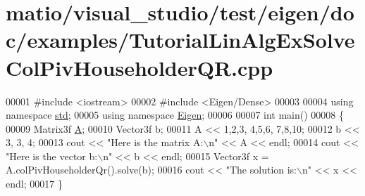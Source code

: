 \hypertarget{matio_2visual__studio_2test_2eigen_2doc_2examples_2_tutorial_lin_alg_ex_solve_col_piv_householder_q_r_8cpp_source}{}\section{matio/visual\+\_\+studio/test/eigen/doc/examples/\+Tutorial\+Lin\+Alg\+Ex\+Solve\+Col\+Piv\+Householder\+QR.cpp}
\label{matio_2visual__studio_2test_2eigen_2doc_2examples_2_tutorial_lin_alg_ex_solve_col_piv_householder_q_r_8cpp_source}

\begin{DoxyCode}
00001 \textcolor{preprocessor}{#include <iostream>}
00002 \textcolor{preprocessor}{#include <Eigen/Dense>}
00003 
00004 \textcolor{keyword}{using namespace }\hyperlink{namespacestd}{std};
00005 \textcolor{keyword}{using namespace }\hyperlink{namespace_eigen}{Eigen};
00006 
00007 \textcolor{keywordtype}{int} main()
00008 \{
00009    Matrix3f \hyperlink{group___core___module_class_eigen_1_1_matrix}{A};
00010    Vector3f b;
00011    A << 1,2,3,  4,5,6,  7,8,10;
00012    b << 3, 3, 4;
00013    cout << \textcolor{stringliteral}{"Here is the matrix A:\(\backslash\)n"} << A << endl;
00014    cout << \textcolor{stringliteral}{"Here is the vector b:\(\backslash\)n"} << b << endl;
00015    Vector3f x = A.colPivHouseholderQr().solve(b);
00016    cout << \textcolor{stringliteral}{"The solution is:\(\backslash\)n"} << x << endl;
00017 \}
\end{DoxyCode}
